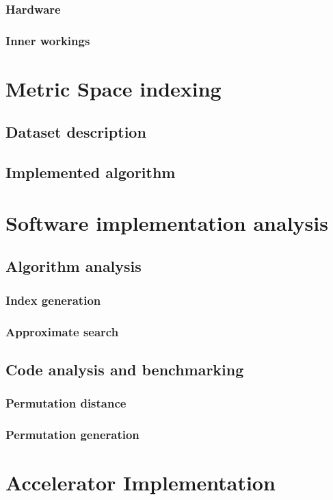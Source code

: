 \documentclass{iccmemoria}
\begin{document}
    \subsection{Hardware}
    \subsection{Inner workings}

\chapter{Metric Space indexing}
  \section{Dataset description}
  \section{Implemented algorithm}

\chapter{Software implementation analysis}
  \section{Algorithm analysis}
    \subsection{Index generation}
    \subsection{Approximate search}
  \section{Code analysis and benchmarking}
    \subsection{Permutation distance}
    \subsection{Permutation generation}

\chapter{Accelerator Implementation}
\end{document}
